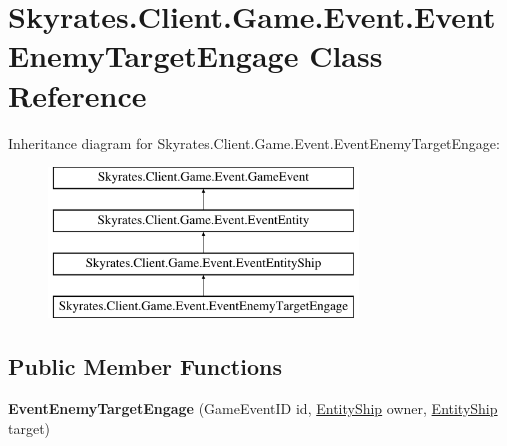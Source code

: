 \hypertarget{class_skyrates_1_1_client_1_1_game_1_1_event_1_1_event_enemy_target_engage}{\section{Skyrates.\-Client.\-Game.\-Event.\-Event\-Enemy\-Target\-Engage Class Reference}
\label{class_skyrates_1_1_client_1_1_game_1_1_event_1_1_event_enemy_target_engage}
}
Inheritance diagram for Skyrates.\-Client.\-Game.\-Event.\-Event\-Enemy\-Target\-Engage\-:\begin{figure}[H]
\begin{center}
\leavevmode
\includegraphics[height=4.000000cm]{class_skyrates_1_1_client_1_1_game_1_1_event_1_1_event_enemy_target_engage}
\end{center}
\end{figure}
\subsection*{Public Member Functions}
\begin{DoxyCompactItemize}
\item 
\hypertarget{class_skyrates_1_1_client_1_1_game_1_1_event_1_1_event_enemy_target_engage_a0dda4e7bbea880d425a72a855a95f3e1}{{\bfseries Event\-Enemy\-Target\-Engage} (Game\-Event\-I\-D id, \hyperlink{class_skyrates_1_1_common_1_1_entity_1_1_entity_ship}{Entity\-Ship} owner, \hyperlink{class_skyrates_1_1_common_1_1_entity_1_1_entity_ship}{Entity\-Ship} target)}\label{class_skyrates_1_1_client_1_1_game_1_1_event_1_1_event_enemy_target_engage_a0dda4e7bbea880d425a72a855a95f3e1}

\end{DoxyCompactItemize}

